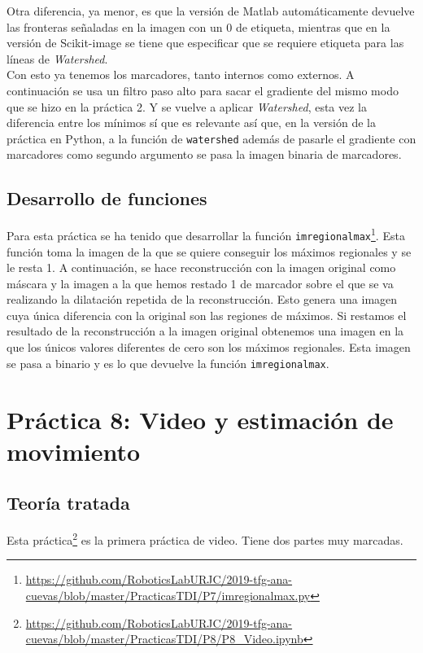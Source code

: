  Otra diferencia, ya menor, es que la versión de Matlab automáticamente devuelve las fronteras señaladas en la imagen con un 0 de etiqueta, mientras que en la versión de Scikit-image se tiene que especificar que se requiere etiqueta para las líneas de \emph{Watershed}.\\

Con esto ya tenemos los marcadores, tanto internos como externos. A continuación se usa un filtro paso alto para sacar el gradiente del mismo modo que se hizo en la práctica 2. Y se vuelve a aplicar  \emph{Watershed}, esta vez la diferencia entre los mínimos sí que es relevante así que, en la versión de la práctica en Python, a la función de \texttt{watershed} además de pasarle el gradiente con marcadores como segundo argumento se pasa la imagen binaria de marcadores.\\


\subsection{Desarrollo de funciones}

Para esta práctica se ha tenido que desarrollar la función \texttt{imregionalmax}\footnote{\url{https://github.com/RoboticsLabURJC/2019-tfg-ana-cuevas/blob/master/PracticasTDI/P7/imregionalmax.py}}. Esta función toma la imagen de la que se quiere conseguir los máximos regionales y se le resta 1. A continuación, se hace reconstrucción con la imagen original como máscara y la imagen a la que hemos restado 1 de marcador sobre el que se va realizando la dilatación repetida de la reconstrucción. Esto genera una imagen cuya única diferencia con la original son las regiones de máximos. Si restamos el resultado de la reconstrucción a la imagen original obtenemos una imagen en la que los únicos valores diferentes de cero son los máximos regionales. Esta imagen se pasa a binario y es lo que devuelve la función \texttt{imregionalmax}.


\section{ Práctica 8: Video y estimación de movimiento}
\subsection{Teoría tratada}

Esta práctica\footnote{\url{https://github.com/RoboticsLabURJC/2019-tfg-ana-cuevas/blob/master/PracticasTDI/P8/P8_Video.ipynb}} es la primera práctica de video. Tiene dos partes muy marcadas.\\

